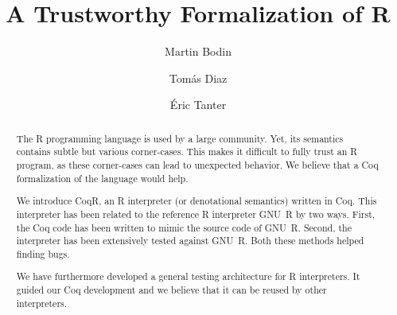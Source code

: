 \documentclass[
    sigplan,
    10pt,
    review, %
    natbib=false %
 ]{acmart}
\newcommand\eti[1]{\todo[color=blue!20,inline]{#1}}
\begin{document}
\title{A Trustworthy Formalization of R} %

\author{Martin Bodin}

\author{Tom{\'a}s Diaz}

\author{{\'E}ric Tanter}

\begin{abstract}
\eti{update when paper is stable:}

    The R programming language is used by a large community.
    Yet, its semantics contains subtle but various corner-cases.
    This makes it difficult to fully trust an R program,
    as these corner-cases can lead to unexpected behavior.
    We believe that a Coq formalization of the language would help.

    We introduce CoqR, an R interpreter (or denotational semantics) written in Coq.
    This interpreter has been related to the reference R interpreter
    GNU~R by two ways.
    First, the Coq code has been written to mimic the source code of GNU~R.
    Second, the interpreter has been extensively tested against GNU~R.
    Both these methods helped finding bugs.

    We have furthermore developed a general testing architecture
    for R interpreters.
    It guided our Coq development
    and we believe that it can be reused by other interpreters.
\end{abstract}
\end{document}
